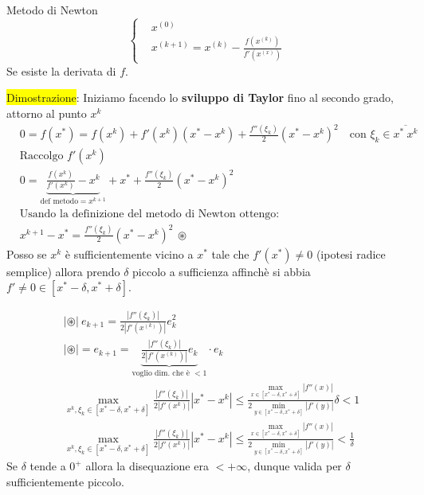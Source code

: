 \documentclass{article}
\begin{document}
\begin{defi}{Metodo di Newton}{}
    \[\begin{cases}
             & x^{(0)}                                                                \\
             & x^{(k+1)}=x^{(k)}-\frac{f\left(x^{(k)}\right)}{f'\left(x^{(x)}\right)}
        \end{cases}\]
    Se esiste la derivata di $f$.
\end{defi}

\colorbox{yellow}{Dimostrazione}: Iniziamo facendo lo \textbf{sviluppo di Taylor} fino al secondo grado, attorno al punto $x^k$
\begin{align*}
     & 0= f\left(x^*\right)=f(x^k)+f'(x^k)(x^*-x^k)+\frac{f''\left(\xi_k\right)}{2}\left(x^*-x^k\right)^2\quad\text{con }\xi_k\in\overline{x^*\ x^k} \\
     & \text{Raccolgo }f'(x^k)                                                                                                                       \\
     & 0=\underbrace{\frac{f(x^k)}{f'(x^k)}-x^k}_{\text{def metodo}=x^{k+1}}+x^*+\frac{f''\left(\xi_k\right)}{2}\left(x^*-x^k\right)^2               \\
     & \text{Usando la definizione del metodo di Newton ottengo:}\\
     & x^{k+1}-x^*=\boxed{\frac{f''\left(\xi_k\right)}{2}\left(x^*-x^k\right)^2}\ \circledast
\end{align*}
Posso se $x^k$ è sufficientemente vicino a $x^*$ tale che $f'(x^*)\ne0$ (ipotesi radice semplice) allora prendo
$\delta$ piccolo a sufficienza affinchè si abbia $f'\ne0\in[x^*-\delta,x^*+\delta]$.

\begin{align*}
     & \left|\circledast\right|\ e_{k+1}=\frac{\left|f''\left(\xi_k\right)\right|}{2\left|f'\left(x^{(k)}\right)\right|}e_k^2                                                                                                                                                    \\
     & \left|\circledast\right|=e_{k+1}=\underbrace{\frac{\left|f''\left(\xi_k\right)\right|}{2\left|f'\left(x^{(k)}\right)\right|}e_k}_{\text{voglio dim. che è }<1}\cdot e_k                                                                                                   \\
     & \max_{x^k,\xi_k\in[x^*-\delta, x^*+\delta]}\frac{\left|f''\left(\xi_k\right)\right|}{2\left|f'(x^k)\right|}\left|x^*-x^k\right|\le\frac{\max_{x\in[x^*-\delta, x^*+\delta]}\left|f''(x)\right|}{2\min_{y\in[x^*-\delta, x^*+\delta]}\left|f'(y)\right|}\delta< 1          \\
     & \max_{x^k,\xi_k\in[x^*-\delta, x^*+\delta]}\frac{\left|f''\left(\xi_k\right)\right|}{2\left|f'(x^k)\right|}\left|x^*-x^k\right|\le\frac{\max_{x\in[x^*-\delta, x^*+\delta]}\left|f''(x)\right|}{2\min_{y\in[x^*-\delta, x^*+\delta]}\left|f'(y)\right|}< \frac{1}{\delta}
\end{align*}
Se $\delta$ tende a $0^+$ allora la disequazione era $<+\infty$, dunque valida per $\delta$ sufficientemente piccolo.
\end{document}
